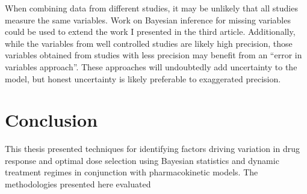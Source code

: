 When combining data from different studies, it may be unlikely that all studies measure the same variables.  Work on Bayesian inference for missing variables could be used to extend the work I presented in the third article.  Additionally, while the variables from well controlled studies are likely high precision, those variables obtained from studies with less precision may benefit from an ``error in variables approach''.  These approaches will undoubtedly add uncertainty to the model, but honest uncertainty is likely preferable to exaggerated precision.

\section{Conclusion}

This thesis presented techniques for identifying factors driving variation in drug response and optimal dose selection using Bayesian statistics and dynamic treatment regimes in conjunction with pharmacokinetic models.  The methodologies presented here evaluated 

